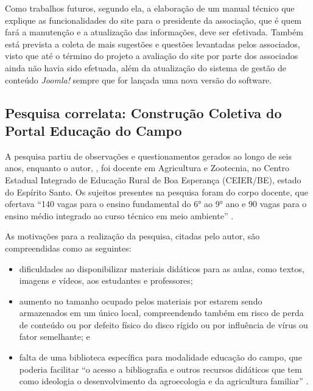 Como trabalhos futuros, segundo ela, a elaboração de um manual técnico que explique as funcionalidades do site para o presidente da associação, que é quem fará a manutenção e a atualização das informações, deve ser efetivada. Também está prevista a coleta de mais sugestões e questões levantadas pelos associados, visto que até o término do projeto a avaliação do site por parte dos associados ainda não havia sido efetuada, além da atualização do sistema de gestão de conteúdo \textit{Joomla!} sempre que for lançada uma nova versão do software.


\hspace{2.5cm}
\subsection{Pesquisa correlata: Construção Coletiva do Portal Educação do Campo}
\hspace{2.5cm}

A pesquisa partiu de observações e questionamentos gerados ao longo de seis anos, enquanto o autor, , foi docente em Agricultura e Zootecnia, no Centro Estadual Integrado de Educação Rural de Boa Esperança (CEIER/BE), estado do Espírito Santo. Os sujeitos presentes na pesquisa foram do corpo docente, que ofertava ``140 vagas para o ensino fundamental do 6° ao 9° ano e 90 vagas para o ensino médio integrado ao curso técnico em meio ambiente'' \cite{soares2017construccao}.

As motivações para a realização da pesquisa, citadas pelo autor, são compreendidas como as seguintes: 

\begin{itemize}
 \item dificuldades ao disponibilizar materiais didáticos para as aulas, como textos, imagens e vídeos, aos estudantes e professores;

 \item aumento no tamanho ocupado pelos materiais por estarem sendo armazenados em um único local, compreendendo também em risco de perda de conteúdo ou por defeito físico do disco rígido ou por influência de vírus ou fator semelhante; e
 
 \item falta de uma biblioteca específica para modalidade educação do campo, que poderia facilitar ``o acesso a bibliografia e outros recursos didáticos que tem como ideologia o desenvolvimento da agroecologia e da agricultura familiar'' \cite{soares2017construccao}.
\end{itemize}

